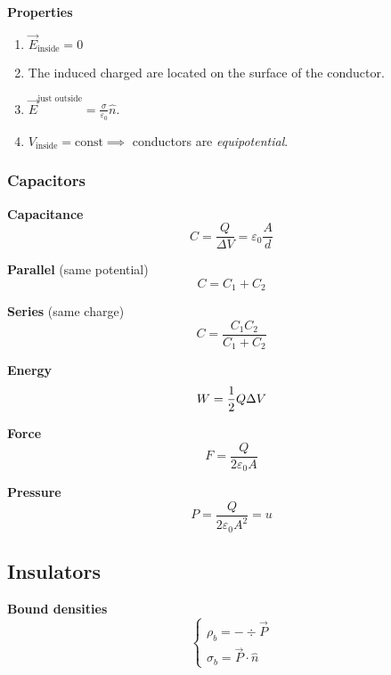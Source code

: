 \documentclass[10pt]{extarticle}
\numberwithin{equation}{section}
\begin{document}
\begin{multicols}{2}
	\textbf{Properties}
	\begin{enumerate}
		\item $\vec E_\text{inside} = 0$
		\item The induced charged are located on the surface of the conductor.
		\item $\vec E^\text{just outside} = \frac{\sigma}{\varepsilon_0} \hat n$.
		\item $V_\text{inside} = \text{const} \implies$ conductors are \emph{equipotential}.
	\end{enumerate}

	\subsubsection{Capacitors}

	\textbf{Capacitance}
	\begin{equation}
		C = \frac{Q }{\Delta V} = \varepsilon_0 \frac{A}{d}
	\end{equation}

	\textbf{Parallel} (same potential)
	\begin{equation}
		C = C_1 + C_2
	\end{equation}

	\textbf{Series} (same charge)
	\begin{equation}
		C = \frac{C_1 C_2}{C_1 + C_2}
	\end{equation}

	\textbf{Energy}
	\begin{equation}
		W = \frac{1}{2} Q \Delta V
	\end{equation}

	\textbf{Force}
	\begin{equation}
		F = \frac{Q}{2 \varepsilon_0 A}
	\end{equation}

	\textbf{Pressure}
	\begin{equation}
		P = \frac{Q}{2 \varepsilon_0 A^2} = u
	\end{equation}

	\subsection{Insulators}

	\textbf{Bound densities}
	\begin{equation}
		\begin{cases}
			\rho_b = -\div \vec P \\
			\sigma_b = \vec P \cdot \hat n
		\end{cases}
	\end{equation}


\end{multicols}
\end{document}
